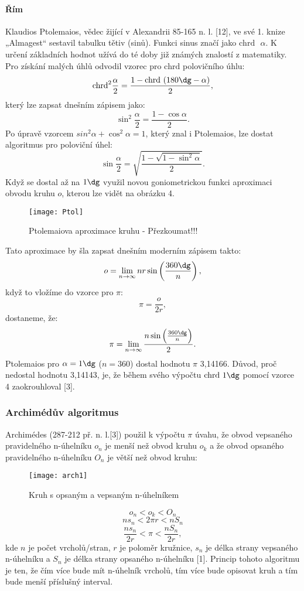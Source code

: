 \documentclass[soc]{gzwroc} %
\begin{document}
\paragraph{Řím}
Klaudios Ptolemaios, vědec žijící v Alexandrii 85-165 n. l. [12], ve své 1. knize „Almagest“ sestavil tabulku tětiv (sinů). Funkci sinus značí jako $\mathrm{chrd} \textrm{ }\alpha$. K určení základních hodnot užívá do té doby již známých znalostí z matematiky. Pro získání malých úhlů odvodil vzorec pro $\mathrm{chrd}$ polovičního úhlu:
$$
\mathrm{chrd}^2\frac{\alpha}{2}=\frac{1-\mathrm{chrd}\textrm{ }(180\dg-\alpha)}{2},
$$
který lze zapsat dnešním zápisem jako:
$$
\sin^2\frac{\alpha}{2}=\frac{1-\cos\alpha}{2}.
$$
Po úpravě vzorcem $sin^2\alpha+\cos^2\alpha=1$, který znal i Ptolemaios, lze dostat algoritmus pro poloviční úhel:
\begin{equation}
\sin\frac{\alpha}{2}=\sqrt{\frac{1-\sqrt{1-\sin^2\alpha}}{2}}.
\end{equation}
Když se dostal až na  $1\dg$ využil novou goniometrickou funkci aproximaci obvodu kruhu $o$, kterou lze vidět na obrázku 4.
\begin{figure}[!ht]
\texttt{[image: Ptol]}
\caption{Ptolemaiova aproximace kruhu - Přezkoumat!!!}
\label{fig:kruh}
\end{figure}
Tato aproximace by šla zapsat dnešním moderním zápisem takto:
$$
o=\lim_{n\to\infty} nr\sin\left(\frac{360\dg}{n}\right),
$$
když to vložíme do vzorce pro $\pi$:
$$
\pi=\frac{o}{2r},
$$
dostaneme, že:
\begin{equation}
\pi=\lim_{n\to\infty}\frac{n\sin\left(\frac{360\dg}{n}\right)}{2}.
\end{equation}
Ptolemaios pro $\alpha = 1\dg$ ($n=360$) dostal hodnotu $\pi$ 3,14166. Důvod, proč nedostal hodnotu 3,14143, je, že během svého výpočtu $\mathrm{chrd} \textrm{ }1\dg$ pomocí vzorce 4 zaokrouhloval [3].
\subsubsection{Archimédův algoritmus}
Archimédes (287-212 př. n. l.[3]) použil k výpočtu $\pi$ úvahu, že obvod vepsaného pravidelného n-úhelníku $o_n$ je menší než obvod kruhu $o_k$ a že obvod opsaného pravidelného n-úhelníku $O_n$ je větší než obvod kruhu:
\begin{figure}[!ht]
\texttt{[image: arch1]}
\caption{Kruh s opsaným a vepsaným n-úhelníkem}
\label{fig:kruh}
\end{figure}
$$ o_n<o_k<O_n $$
$$ ns_n<2\pi r<nS_n $$
\begin{equation}
\frac{ns_n}{2r}<\pi<\frac{nS_n}{2r},
\end{equation}
kde $n$ je počet vrcholů/stran, $r$ je poloměr kružnice, $s_n$ je délka strany vepsaného n-úhelníku a $S_n$ je délka strany opsaného n-úhelníku [1]. Princip tohoto algoritmu je ten, že čím více bude mít n-úhelník vrcholů, tím více bude opisovat kruh a tím bude menší příslušný interval.
\end{document}
